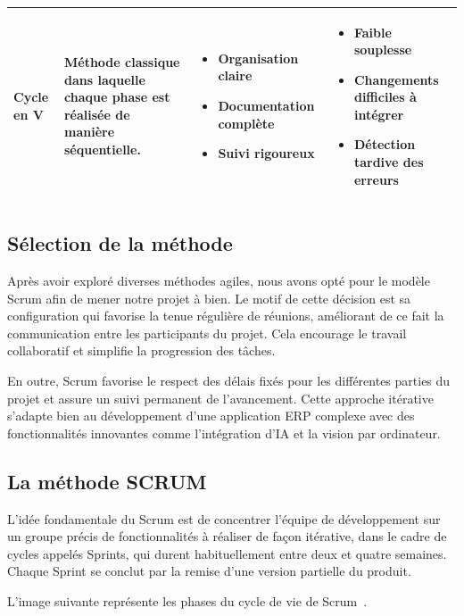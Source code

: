\begin{longtable}{|p{2.3cm}|p{4.2cm}|p{4cm}|p{4cm}|}
\textbf{Cycle en V} &
Méthode classique dans laquelle chaque phase est réalisée de manière séquentielle. &
\begin{itemize}[leftmargin=*,nosep]
    \item Organisation claire
    \item Documentation complète
    \item Suivi rigoureux
\end{itemize}
&
\begin{itemize}[leftmargin=*,nosep]
    \item Faible souplesse
    \item Changements difficiles à intégrer
    \item Détection tardive des erreurs
\end{itemize} \\ \hline

\end{longtable}
\normalsize

\subsection{Sélection de la méthode}

Après avoir exploré diverses méthodes agiles, nous avons opté pour le modèle Scrum afin de mener notre projet à bien. Le motif de cette décision est sa configuration qui favorise la tenue régulière de réunions, améliorant de ce fait la communication entre les participants du projet. Cela encourage le travail collaboratif et simplifie la progression des tâches.

En outre, Scrum favorise le respect des délais fixés pour les différentes parties du projet et assure un suivi permanent de l'avancement. Cette approche itérative s'adapte bien au développement d'une application ERP complexe avec des fonctionnalités innovantes comme l'intégration d'IA et la vision par ordinateur.

\subsection{La méthode SCRUM}

L'idée fondamentale du Scrum est de concentrer l'équipe de développement sur un groupe précis de fonctionnalités à réaliser de façon itérative, dans le cadre de cycles appelés Sprints, qui durent habituellement entre deux et quatre semaines. Chaque Sprint se conclut par la remise d'une version partielle du produit.

L'image suivante représente les phases du cycle de vie de Scrum~\cite{ref2}.

